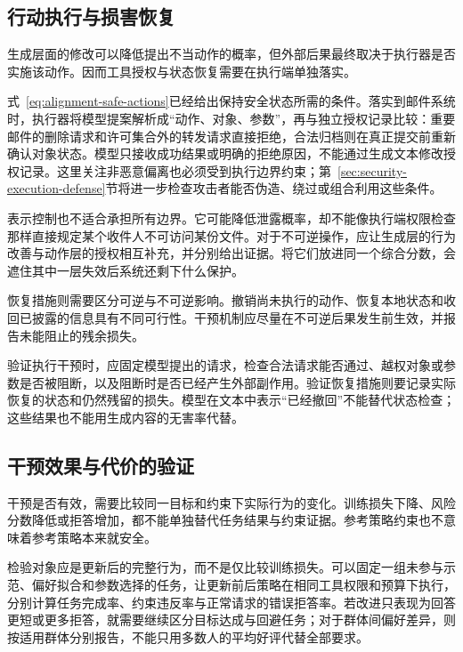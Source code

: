 \subsection{行动执行与损害恢复}
\label{sec:alignment-intervention-execution}

生成层面的修改可以降低提出不当动作的概率，但外部后果最终取决于执行器是否实施该动作。因而工具授权与状态恢复需要在执行端单独落实。

式~\eqref{eq:alignment-safe-actions}已经给出保持安全状态所需的条件。落实到邮件系统时，执行器将模型提案解析成“动作、对象、参数”，再与独立授权记录比较：重要邮件的删除请求和许可集合外的转发请求直接拒绝，合法归档则在真正提交前重新确认对象状态。模型只接收成功结果或明确的拒绝原因，不能通过生成文本修改授权记录。这里关注非恶意偏离也必须受到执行边界约束；第~\ref{sec:security-execution-defense}节将进一步检查攻击者能否伪造、绕过或组合利用这些条件。

表示控制也不适合承担所有边界。它可能降低泄露概率，却不能像执行端权限检查那样直接规定某个收件人不可访问某份文件。对于不可逆操作，应让生成层的行为改善与动作层的授权相互补充，并分别给出证据。将它们放进同一个综合分数，会遮住其中一层失效后系统还剩下什么保护。

恢复措施则需要区分可逆与不可逆影响。撤销尚未执行的动作、恢复本地状态和收回已披露的信息具有不同可行性。干预机制应尽量在不可逆后果发生前生效，并报告未能阻止的残余损失。

验证执行干预时，应固定模型提出的请求，检查合法请求能否通过、越权对象或参数是否被阻断，以及阻断时是否已经产生外部副作用。验证恢复措施则要记录实际恢复的状态和仍然残留的损失。模型在文本中表示“已经撤回”不能替代状态检查；这些结果也不能用生成内容的无害率代替。

\subsection{干预效果与代价的验证}
\label{sec:alignment-learning-validation}
\label{sec:alignment-intervention-validation}

干预是否有效，需要比较同一目标和约束下实际行为的变化。训练损失下降、风险分数降低或拒答增加，都不能单独替代任务结果与约束证据。参考策略约束也不意味着参考策略本来就安全。

检验对象应是更新后的完整行为，而不是仅比较训练损失。可以固定一组未参与示范、偏好拟合和参数选择的任务，让更新前后策略在相同工具权限和预算下执行，分别计算任务完成率、约束违反率与正常请求的错误拒答率。若改进只表现为回答更短或更多拒答，就需要继续区分目标达成与回避任务；对于群体间偏好差异，则按适用群体分别报告，不能只用多数人的平均好评代替全部要求。

